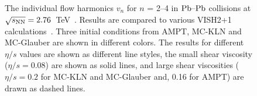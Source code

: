 \begin{figure}[h]
\begin{center}
        \caption{The individual flow harmonics $v_n$ for $n$ = 2--4 in $\textnormal{Pb--Pb}$ collisions at $\sqrt{s_{\textnormal{NN}}}=2.76$~TeV~\cite{Adam:2016izf}. Results are compared to various VISH2+1 calculations~\cite{Zhu:2016puf}. Three initial conditions from AMPT, MC-KLN and MC-Glauber are shown in different colors. The results for different $\eta/s$ values are shown as different line styles, the small shear viscosity ($\eta/s = 0.08$) are shown as solid lines, and large shear viscosities ($\eta/s = 0.2$ for MC-KLN and MC-Glauber and, 0.16 for AMPT) are drawn as dashed lines.}
        \label{fig:Figure_A2}
              \end{center}
\end{figure}

